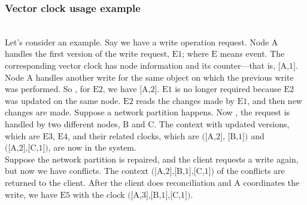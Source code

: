 \subsubsection{Vector clock usage example}\label{FtGn7c7xZIcnJV-a-yf6x}
\\
Let's consider an example. Say we have a write operation request. Node
\protect{}\label{katex_inline_MBRpNV9Aw5U9MHV6BQmP1}{{{\(\text{A}\)}}} handles the first version of the write request, \protect{}\label{katex_inline_JP3hFPN0rpLunIaTN3J4j}{{{\(\text{E1}\)}}}; where \protect{}\label{katex_inline_QxFHqsNNQjyWZwXS_d3PD}{{{\(\text{E}\)}}} means event. The corresponding vector clock has node information and its counter---that is, \protect{}\label{katex_inline_pNXJH8_B7LVJRF58LPvOO}{{{\(\text{[A,1]}\)}}}. Node
\protect{}\label{katex_inline_ONyymBVbAS4hJDUONlRXy}{{{\(\text{A}\)}}} handles another write for the same object on which the previous write was performed. So
, for \protect{}\label{katex_inline_3Rk1E9prtr2BtB2DZE-lc}{{{\(\text{E2}\)}}}, we have \protect{}\label{katex_inline_BDaLEMCkdHkPHrnIxDSaQ}{{{\(\text{[A,2]}\)}}}. \protect{}\label{katex_inline_d42ORu_rVMJt2ePWQXVUj}{{{\(\text{E1}\)}}} is no longer required because \protect{}\label{katex_inline_gbvTJ1qe4dkl0sBWgsjU7}{{{\(\text{E2}\)}}} was updated on the same node. \protect{}\label{katex_inline_DlY4Piyrpt33XZ_kA5_sW}{{{\(\text{E2}\)}}} reads the changes made by \protect{}\label{katex_inline_mhX6geWe6vrSNLXDQZ0eO}{{{\(\text{E1}\)}}}, and then new changes are made. Suppose a network partition happens. Now , the request is handled by two different nodes, \protect{}\label{katex_inline_nVTDF4LjRe0G0Ik_HgYgE}{{{\(\text{B}\)}}} and \protect{}\label{katex_inline_WWOe4UMlL-SNMjcf-7wFT}{{{\(\text{C}\)}}}. The context with updated versions, which are \protect{}\label{katex_inline_fKrpO918c6xz2JENNOxn1}{{{\(\text{E3}\)}}}, \protect{}\label{katex_inline_A3irZ-Ptxiah7LJ_MwVg3}{{{\(\text{E4}\)}}}, and their related clocks, which are \protect{}\label{katex_inline_HvHFwRXBv04IbXAgK52uE}{{{\(\text{([A,2], [B,1])}\)}}} and \protect{}\label{katex_inline_MIWs4g-QgQbVOT-vgMQCw}{{{\(\text{([A,2],[C,1])}\)}}}, are now in the system.
\\
Suppose the network partition is repaired, and the client requests a write again, but now we have conflicts. The context \protect{}\label{katex_inline_9ljI1chwSZ-D0dnGsLgBB}{{{\(\text{([A,2],[B,1],[C,1])}\)}}} of the conflicts are returned to the client. After the client does reconciliation and \protect{}\label{katex_inline_m0lU0Ly5PzECgAMylvsIQ}{{{\(\text{A}\)}}} coordinates the write, we have \protect{}\label{katex_inline_RmumDcYp9AQDQL5ucWwbR}{{{\(\text{E5}\)}}} with the clock \protect{}\label{katex_inline_KMdbvnQFNokWFsmnsPE5M}{{{\(\text{([A,3],[B,1],[C,1])}\)}}}.

